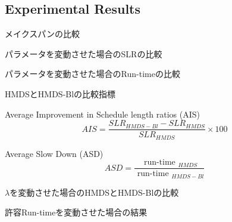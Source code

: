 \subsection{Experimental Results}
\label{ssec: Experimental Results}

\begin{frame}{メイクスパンの比較}
\end{frame}

\begin{frame}{パラメータを変動させた場合のSLRの比較}
\end{frame}

\begin{frame}{パラメータを変動させた場合のRun-timeの比較}
\end{frame}

\begin{frame}{HMDSとHMDS-Blの比較指標}
    \begin{block}{Average Improvement in Schedule length ratios (AIS)}
        \begin{equation}
            A I S=\frac{S L R_{H M D S-B l}-S L R_{H M D S}}{S L R_{H M D S}} \times 100
        \end{equation}
    \end{block}
    \begin{block}{Average Slow Down (ASD)}
        \begin{equation}
            A S D=\frac{\text { run-time }_{H M D S}}{\text { run-time }_{H M D S-B l}}
        \end{equation}
    \end{block}
\end{frame}

\begin{frame}{$\lambda$を変動させた場合のHMDSとHMDS-Blの比較}
\end{frame}

\begin{frame}{許容Run-timeを変動させた場合の結果}
\end{frame}
